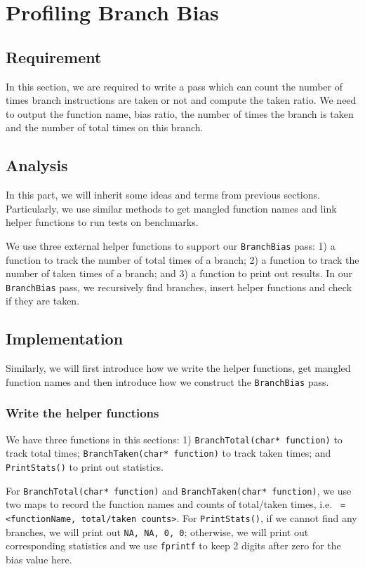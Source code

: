\documentclass{acm_proc_article-sp}
\begin{document}
\section{Profiling Branch Bias}
\subsection{Requirement}
In this section, we are required to write a pass which can count the number of times branch instructions are taken or not and compute the taken ratio. We need to output the function name, bias ratio, the number of times the branch is taken and the number of total times on this branch.

\subsection{Analysis}
In this part, we will inherit some ideas and terms from previous sections. Particularly, we use similar methods to get mangled function names and link helper functions to run tests on benchmarks.

We use three external helper functions to support our {\tt BranchBias} pass: 1) a function to track the number of total times of a branch; 2) a function to track the number of taken times of a branch; and 3) a function to print out results. In our {\tt BranchBias} pass, we recursively find branches, insert helper functions and check if they are taken.

\subsection{Implementation}

Similarly, we will first introduce how we write the helper functions, get mangled function names and then introduce how we construct the {\tt BranchBias} pass.

\subsubsection{Write the helper functions}
We have three functions in this sections: 1) {\tt BranchTotal(char* function)} to track total times; {\tt BranchTaken(char* function)} to track taken times; and {\tt PrintStats()} to print out statistics.

For {\tt BranchTotal(char* function)} and {\tt BranchTaken(char* function)}, we use two maps to record the function names and counts of total/taken times, i.e. {\tt<key, value> = <functionName, total/taken counts>}. For {\tt PrintStats()}, if we cannot find any branches, we will print out {\tt NA, NA, 0, 0}; otherwise, we will print out corresponding statistics and we use {\tt fprintf} to keep 2 digits after zero for the bias value here.
\end{document}
